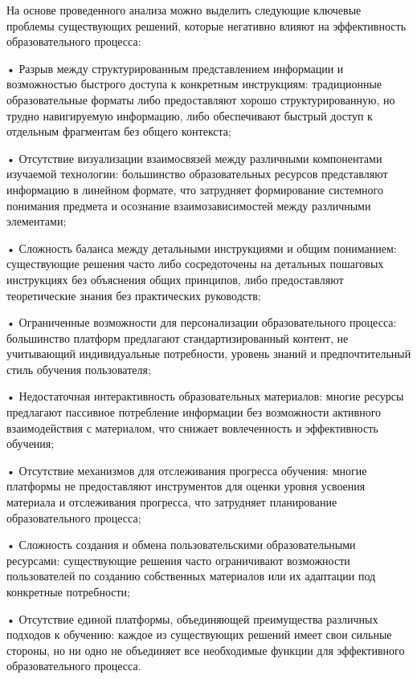 {\gostFont
  
  \par \redline На основе проведенного анализа можно выделить следующие ключевые проблемы существующих решений, которые негативно влияют на эффективность образовательного процесса:

  \par \redline • Разрыв между структурированным представлением информации и возможностью быстрого доступа к конкретным инструкциям: традиционные образовательные форматы либо предоставляют хорошо структурированную, но трудно навигируемую информацию, либо обеспечивают быстрый доступ к отдельным фрагментам без общего контекста;
  \par \redline • Отсутствие визуализации взаимосвязей между различными компонентами изучаемой технологии: большинство образовательных ресурсов представляют информацию в линейном формате, что затрудняет формирование системного понимания предмета и осознание взаимозависимостей между различными элементами;
  \par \redline • Сложность баланса между детальными инструкциями и общим пониманием: существующие решения часто либо сосредоточены на детальных пошаговых инструкциях без объяснения общих принципов, либо предоставляют теоретические знания без практических руководств;
  \par \redline • Ограниченные возможности для персонализации образовательного процесса: большинство платформ предлагают стандартизированный контент, не учитывающий индивидуальные потребности, уровень знаний и предпочтительный стиль обучения пользователя;
  \par \redline • Недостаточная интерактивность образовательных материалов: многие ресурсы предлагают пассивное потребление информации без возможности активного взаимодействия с материалом, что снижает вовлеченность и эффективность обучения;
  \par \redline • Отсутствие механизмов для отслеживания прогресса обучения: многие платформы не предоставляют инструментов для оценки уровня усвоения материала и отслеживания прогресса, что затрудняет планирование образовательного процесса;
  \par \redline • Сложность создания и обмена пользовательскими образовательными ресурсами: существующие решения часто ограничивают возможности пользователей по созданию собственных материалов или их адаптации под конкретные потребности;
  \par \redline • Отсутствие единой платформы, объединяющей преимущества различных подходов к обучению: каждое из существующих решений имеет свои сильные стороны, но ни одно не объединяет все необходимые функции для эффективного образовательного процесса.

  \par
}

